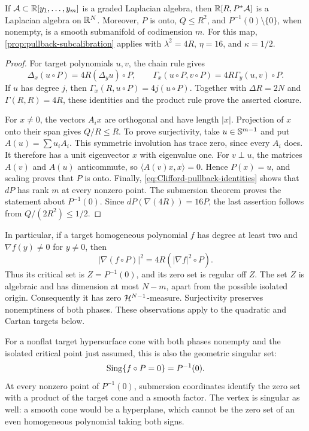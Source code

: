 \begin{lemma}
\label{lem:Clifford-algebra-pullback}
If \(\mathcal A\subset\mathbb R[y_1,\ldots,y_m]\) is a graded Laplacian algebra,
then \(\mathbb R[R,P^*\mathcal A]\) is a Laplacian algebra on \(\mathbb R^N\).
Moreover, \(P\) is onto, \(Q\leq R^2\), and
\(P^{-1}(0)\setminus\{0\}\), when nonempty, is a smooth
submanifold of codimension \(m\).
For this map, \cref{prop:pullback-subcalibration} applies with
\(\lambda^2=4R\), \(\eta=16\), and \(\kappa=1/2\).
\end{lemma}

\begin{proof}
For target polynomials \(u,v\), the chain rule gives
\[
 \Delta_x(u\circ P)=4R(\Delta_yu)\circ P,\qquad
 \Gamma_x(u\circ P,v\circ P)=4R\Gamma_y(u,v)\circ P.
\]
If \(u\) has degree \(j\), then
\(\Gamma_x(R,u\circ P)=4j(u\circ P)\).
Together with \(\Delta R=2N\) and \(\Gamma(R,R)=4R\), these
identities and the product rule prove the asserted closure.

For \(x\ne0\), the vectors \(A_ix\) are orthogonal and have
length \(|x|\).  Projection of \(x\) onto their span gives
\(Q/R\leq R\).  To prove surjectivity, take \(u\in\mathbb S^{m-1}\)
and put \(A(u)=\sum u_iA_i\).  This symmetric involution has trace
zero, since every \(A_i\) does.  It therefore has a unit eigenvector
\(x\) with eigenvalue one.  For \(v\perp u\),
the matrices \(A(v)\) and \(A(u)\) anticommute, so
\(\langle A(v)x,x\rangle=0\).  Hence \(P(x)=u\), and scaling
proves that \(P\) is onto.  Finally, \eqref{eq:Clifford-pullback-identities}
shows that \(dP\) has rank \(m\) at every nonzero point.  The
submersion theorem proves the statement about \(P^{-1}(0)\).
Since \(dP(\nabla(4R))=16P\), the last assertion follows from
\(Q/(2R^2)\leq1/2\).
\end{proof}

In particular, if a target homogeneous polynomial \(f\) has degree
at least two and \(\nabla f(y)\ne0\) for \(y\ne0\), then
\[
 |\nabla(f\circ P)|^2=4R(|\nabla f|^2\circ P).
\]
Thus its critical set is \(Z=P^{-1}(0)\), and its zero set is
regular off \(Z\).  The set \(Z\) is algebraic and has dimension
at most \(N-m\), apart from the possible isolated origin.
Consequently it has zero \(\mathcal H^{N-1}\)-measure. Surjectivity preserves
nonemptiness of both phases. These observations apply to the quadratic
and Cartan targets below.

For a nonflat target hypersurface cone with both phases nonempty
and the isolated critical point just assumed, this is also the
geometric singular set:
\[
 \operatorname{Sing}\{f\circ P=0\}=P^{-1}(0).
\]
At every nonzero point of \(P^{-1}(0)\), submersion coordinates
identify the zero set with a product of the target cone and a smooth
factor. The vertex is singular as well: a smooth cone would be a
hyperplane, which cannot be the zero set of an even homogeneous
polynomial taking both signs.




